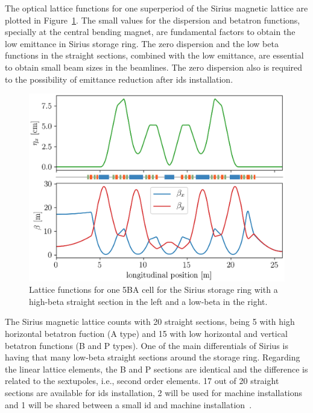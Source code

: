 The optical lattice functions for one superperiod of the Sirius magnetic lattice are plotted in Figure~\ref{fig:twiss_functions}. The small values for the dispersion and betatron functions, specially at the central bending magnet, are fundamental factors to obtain the low emittance in Sirius storage ring. The zero dispersion and the low beta functions in the straight sections, combined with the low emittance, are essential to obtain small beam sizes in the beamlines. The zero dispersion also is required to the possibility of emittance reduction after \glspl{id} installation.
\begin{figure}
    \centering
    \includegraphics[scale=1.0]{figures/twiss_plot_refine.eps}
    \caption{Lattice functions for one 5BA cell for the Sirius storage ring with a high-beta straight section in the left and a low-beta in the right.}
    \label{fig:twiss_functions}
\end{figure}

The Sirius magnetic lattice counts with 20 straight sections, being 5 with high horizontal betatron fuction (A type) and 15 with low horizontal and vertical betatron functions (B and P types). One of the main differentials of Sirius is having that many low-beta straight sections around the storage ring. Regarding the linear lattice elements, the B and P sections are identical and the difference is related to the sextupoles, i.e., second order elements. 17 out of 20 straight sections are available for \glspl{id} installation, 2 will be used for machine installations and 1 will be shared between a small \gls{id} and machine installation~\cite{liu2019}. 

